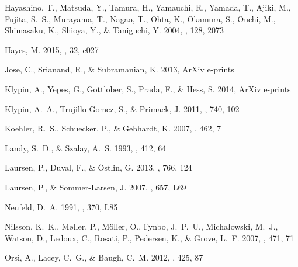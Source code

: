 \documentclass{emulateapj}
\begin{document}
\begin{thebibliography}{38}
{Hayashino}, T., {Matsuda}, Y., {Tamura}, H., {Yamauchi}, R., {Yamada}, T.,
  {Ajiki}, M., {Fujita}, S.~S., {Murayama}, T., {Nagao}, T., {Ohta}, K.,
  {Okamura}, S., {Ouchi}, M., {Shimasaku}, K., {Shioya}, Y., \& {Taniguchi}, Y.
  2004, \aj, 128, 2073

{Hayes}, M. 2015, \pasa, 32, e027

{Jose}, C., {Srianand}, R., \& {Subramanian}, K. 2013, ArXiv e-prints

{Klypin}, A., {Yepes}, G., {Gottlober}, S., {Prada}, F., \& {Hess}, S. 2014,
  ArXiv e-prints

{Klypin}, A.~A., {Trujillo-Gomez}, S., \& {Primack}, J. 2011, \apj, 740, 102

{Koehler}, R.~S., {Schuecker}, P., \& {Gebhardt}, K. 2007, \aap, 462, 7

{Landy}, S.~D., \& {Szalay}, A.~S. 1993, \apj, 412, 64

{Laursen}, P., {Duval}, F., \& {{\"O}stlin}, G. 2013, \apj, 766, 124

{Laursen}, P., \& {Sommer-Larsen}, J. 2007, \apjl, 657, L69

{Neufeld}, D.~A. 1991, \apjl, 370, L85

{Nilsson}, K.~K., {M{\o}ller}, P., {M{\"o}ller}, O., {Fynbo}, J.~P.~U.,
  {Micha{\l}owski}, M.~J., {Watson}, D., {Ledoux}, C., {Rosati}, P.,
  {Pedersen}, K., \& {Grove}, L.~F. 2007, \aap, 471, 71

{Orsi}, A., {Lacey}, C.~G., \& {Baugh}, C.~M. 2012, \mnras, 425, 87


\end{thebibliography}
\end{document}
